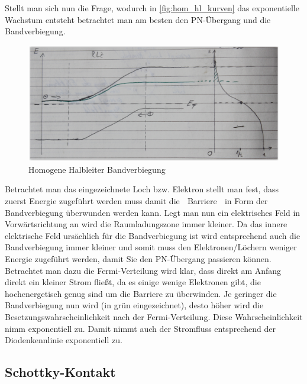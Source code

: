 \documentclass[12pt,a4paper]{report}%
\numberwithin{equation}{section}
\numberwithin{equation}{subsection}
\begin{document}
  Stellt man sich nun die Frage, wodurch in \eqref{fig:hom_hl_kurven} das exponentielle Wachstum entsteht betrachtet man am besten den PN-Übergang und die Bandverbiegung.
  \begin{figure}[H]
	  \centering
	  \captionsetup{justification=centering}
	  \includegraphics[width=0.6\linewidth]{hom_hl_pn.png}
	  \caption{Homogene Halbleiter Bandverbiegung}
	  \label{fig:hom_hl_pn}
	\end{figure}
	Betrachtet man das eingezeichnete Loch bzw. Elektron stellt man fest, dass zuerst Energie zugeführt werden muss damit die $\;$ \grqq Barriere \grqq $\;$ in Form der Bandverbiegung überwunden werden kann. Legt man nun ein elektrisches Feld in Vorwärtsrichtung an wird die Raumladungszone immer kleiner. Da das innere elektrische Feld ursächlich für die Bandverbiegung ist wird entsprechend auch die Bandverbiegung immer kleiner und somit muss den Elektronen/Löchern weniger Energie zugeführt werden, damit Sie den PN-Übergang passieren können. Betrachtet man dazu die Fermi-Verteilung wird klar, dass direkt am Anfang direkt ein kleiner Strom fließt, da es einige wenige Elektronen gibt, die hochenergetisch genug sind um die Barriere zu überwinden. Je geringer die Bandverbiegung nun wird (in grün eingezeichnet), desto höher wird die Besetzungswahrscheinlichkeit nach der Fermi-Verteilung. Diese Wahrscheinlichkeit nimm exponentiell zu. Damit nimmt auch der Stromfluss entsprechend der Diodenkennlinie exponentiell zu.
	
	\subsection{Schottky-Kontakt}
\end{document}
